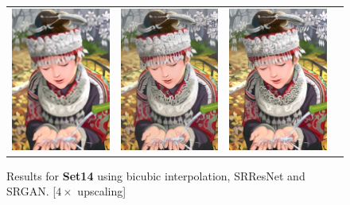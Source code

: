\documentclass[10pt,twocolumn,letterpaper]{article}
\begin{document}
\begin{figure}[h!]
\begin{tabular}{cccc}
     	\includegraphics[width=1.5in]{images/used/appendix/jpg/Set14/comic_SRResNet-MSE} &
     	\includegraphics[width=1.5in]{images/used/appendix/jpg/Set14/comic_SRGAN-VGG54} &
     	\includegraphics[width=1.5in]{images/used/appendix/jpg/Set14/comic_HR} \\     	
  	\end{tabular}
  	\label{fig:app_Set14a}
  	\caption{Results for \textbf{Set14} using bicubic interpolation, SRResNet and SRGAN. [$4\times$ upscaling]} 
\end{figure}
\end{document}
